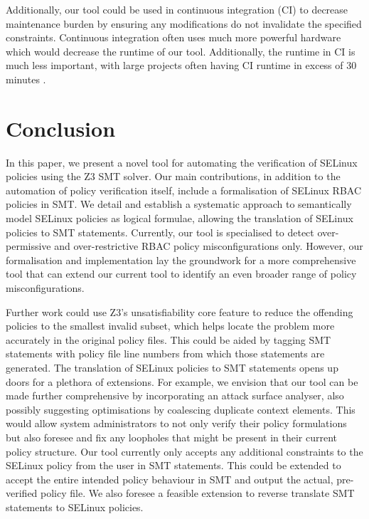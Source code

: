 \documentclass[acmsmall,screen,nonacm]{acmart}
\begin{document}
Additionally, our tool could be used in continuous integration (CI) to decrease 
maintenance burden by ensuring any modifications do not invalidate the 
specified constraints. Continuous integration often uses much more powerful 
hardware which would decrease the runtime of our tool. Additionally, the 
runtime in CI is much less important, with large projects often having CI 
runtime in excess of 30 minutes \cite{rust-ci}.

\section{Conclusion}

In this paper, we present a novel tool for automating the verification of 
SELinux policies using the Z3 SMT solver. Our main contributions, in addition 
to the automation of policy verification itself, include a formalisation of 
SELinux RBAC policies in SMT. We detail and establish a systematic approach to 
semantically model SELinux policies as logical formulae, allowing the 
translation of SELinux policies to SMT statements. Currently, our tool is 
specialised to detect over-permissive and over-restrictive RBAC policy 
misconfigurations only. However, our formalisation and implementation lay the 
groundwork for a more comprehensive tool that can extend our current tool to 
identify an even broader range of policy misconfigurations.

Further work could use Z3's unsatisfiability core feature to reduce the 
offending policies to the smallest invalid subset, which helps locate the 
problem more accurately in the original policy files. This could be aided by 
tagging SMT statements with policy file line numbers from which those 
statements are generated. The translation of SELinux policies to SMT statements 
opens up doors for a plethora of extensions. For example, we envision that our 
tool can be made further comprehensive by incorporating an attack surface 
analyser, also possibly suggesting optimisations by coalescing duplicate 
context elements. This would allow system administrators to not only verify 
their policy formulations but also foresee and fix any loopholes that might be 
present in their current policy structure. Our tool currently only accepts any 
additional constraints to the SELinux policy from the user in SMT statements. 
This could be extended to accept the entire intended policy behaviour in SMT 
and output the actual, pre-verified policy file. We also foresee a feasible 
extension to reverse translate SMT statements to SELinux policies.
\end{document}
